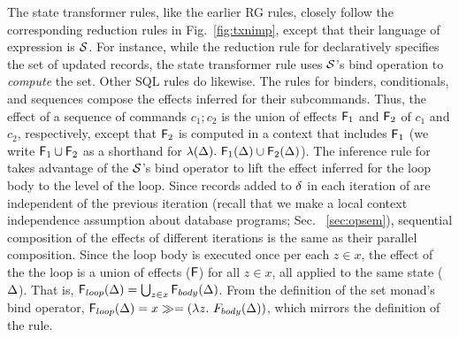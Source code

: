 The state transformer rules, like the earlier RG rules, closely follow
the corresponding reduction rules in Fig.~\ref{fig:txnimp}, except
that their language of expression is $\mathcal{S}$. For instance, while the
reduction rule for  declaratively specifies the set of
updated records, the state transformer rule uses $\mathcal{S}$'s bind
operation to \emph{compute} the set. Other SQL rules do likewise. The
rules for  binders, conditionals, and sequences compose the
effects inferred for their subcommands. Thus, the effect of a sequence
of commands $c_1;c_2$ is the union of effects ${\sf F}_1$ and ${\sf F}_2$ of
$c_1$ and $c_2$, respectively, except that ${\sf F}_2$ is computed in a
context that includes ${\sf F}_1$ (we write ${\sf F}_1 \cup {\sf F}_2$ as a shorthand
for $\lambda(\Delta).~{\sf F}_1(\Delta) \cup {\sf F}_2(\Delta)$). The inference rule
for  takes advantage of the $\mathcal{S}$'s bind operator to lift
the effect inferred for the loop body to the level of the loop. Since
records added to $\delta$ in each iteration of  are
independent of the previous iteration (recall that we make a local
context independence assumption about database programs; Sec.
~\ref{sec:opsem}), sequential composition of the effects of different
iterations is the same as their parallel composition. Since the loop
body is executed once per each $z\in x$, the effect of the the loop is
a union of effects (${\sf F}$) for all $z\in x$, all applied to the same
state ($\Delta$).  That is, ${\sf F}_{loop}(\Delta) = \bigcup_{z\in
x}{\sf F}_{body}(\Delta)$. From the definition of the set monad's bind
operator, ${\sf F}_{loop}(\Delta) = x \gg= (\lambda z.~F_{body}(\Delta))$,
which mirrors the definition of the rule.



